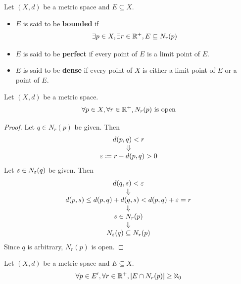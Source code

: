 \bigskip

\begin{definition} \label{an:def:bounded-perfect-dense-sets}
    Let $(X, d)$ be a metric space and $E \subseteq X$.
    \begin{itemize}
        \item $E$ is said to be \textbf{bounded} if
        \[
        \exists p \in X, \exists r \in \R^{+}, E \subseteq N_{r}(p)
        \]
        \item $E$ is said to be \textbf{perfect} if every point of $E$ is a limit point of $E$.
        \item $E$ is said to be \textbf{dense} if every point of $X$ is either a limit point of $E$ or a point of $E$.
    \end{itemize}
\end{definition}

\bigskip

\begin{theorem} \label{an:thm:neighborhood-is-open}
    Let $(X, d)$ be a metric space.
    \[
    \forall p \in X, \forall r \in \R^{+}, N_{r}(p) \text{ is open}
    \]
\end{theorem}

\begin{proof}
    Let $q \in N_{r}(p)$ be given. Then
    \[
    \begin{array}{c}
        d(p, q) < r \\
        \Downarrow \\
        \veps \coloneqq r - d(p, q) > 0
    \end{array}
    \]
    Let $s \in N_{\veps}(q)$ be given. Then
    \[
    \begin{array}{c}
        d(q, s) < \veps \\
        \Downarrow \\
        d(p, s) \leq d(p, q) + d(q, s) < d(p, q) + \veps = r \\
        \Downarrow \\
        s \in N_{r}(p) \\
        \Downarrow \\
        N_{\veps}(q) \subseteq N_{r}(p)
    \end{array}
    \]
    Since $q$ is arbitrary, $N_{r}(p)$ is open.
\end{proof}

\bigskip

\begin{theorem} \label{an:thm:limit-point-neighborhood-contains-infinite-elements}
    Let $(X, d)$ be a metric space and $E \subseteq X$.
    \[
    \forall p \in E', \forall r \in \R^{+}, \abs*{E \cap N_{r}(p)} \geq \aleph_{0}
    \]
\end{theorem}

